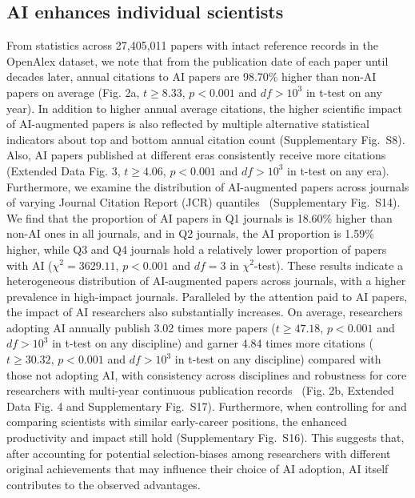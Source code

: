 \subsection*{AI enhances individual scientists}
From statistics across 27,405,011 papers with intact reference records in the OpenAlex dataset, we note that from the publication date of each paper until decades later, annual citations to AI papers are 98.70\% higher than non-AI papers on average (Fig. 2a, $t\geq8.33$, $p<0.001$ and $df>10^3$ in t-test on any year).
In addition to higher annual average citations, the higher scientific impact of AI-augmented papers is also reflected by multiple alternative statistical indicators about top and bottom annual citation count (Supplementary Fig.~S8).
Also, AI papers published at different eras consistently receive more citations (Extended Data Fig. 3, $t\geq4.06$, $p<0.001$ and $df>10^3$ in t-test on any era).
Furthermore, we examine the distribution of AI-augmented papers across journals of varying Journal Citation Report (JCR) quantiles~\supercite{jcr} (Supplementary Fig.~S14).
We find that the proportion of AI papers in Q1 journals is 18.60\% higher than non-AI ones in all journals, and in Q2 journals, the AI proportion is 1.59\% higher, while Q3 and Q4 journals hold a relatively lower proportion of papers with AI ($\chi^2=3629.11$, $p<0.001$ and $df=3$ in $\chi^2$-test).
These results indicate a heterogeneous distribution of AI-augmented papers across journals, with a higher prevalence in high-impact journals.
Paralleled by the attention paid to AI papers, the impact of AI researchers also substantially increases.
On average, researchers adopting AI annually publish 3.02 times more papers ($t\geq47.18$, $p<0.001$ and $df>10^3$ in t-test on any discipline) and garner 4.84 times more citations ($t\geq30.32$, $p<0.001$ and $df>10^3$ in t-test on any discipline) compared with those not adopting AI, with consistency across disciplines and robustness for core researchers with multi-year continuous publication records~\supercite{ioannidis2014estimates} (Fig. 2b, Extended Data Fig. 4 and Supplementary Fig.~S17).
Furthermore, when controlling for and comparing scientists with similar early-career positions, the enhanced productivity and impact still hold (Supplementary Fig.~S16).
This suggests that, after accounting for potential selection-biases among researchers with different original achievements that may influence their choice of AI adoption, AI itself contributes to the observed advantages.


